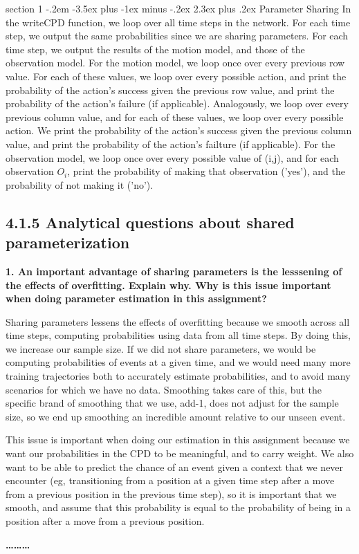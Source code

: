 \documentclass[12pt]{article}
\makeatletter
\newenvironment{problem}{\@startsection
       {section}
       {1}
       {-.2em}
       {-3.5ex plus -1ex minus -.2ex}
       {2.3ex plus .2ex}
       {\pagebreak[3]%
       \large\bf\noindent{Problem }
       }
       }
       {%
       \begin{center}\large\bf \ldots\ldots\ldots\end{center}}
\makeatother
\begin{document}
\begin{problem}{Parameter Sharing}
In the writeCPD function, we loop over all time steps in the network.
For each time step, we output the same probabilities since we are 
sharing parameters.  For each time step, we output the results of the 
motion model, and those of the observation model.
For the motion model, we loop once over every previous row value.  For 
each of these values, we loop over every possible action, and print the
probability of the action's success given the previous row value, and
print the probability of the action's failure (if applicable).  
Analogously, we loop over every previous column value, and for each of 
these values, we loop over every possible action.  We print the 
probability of the action's success given the previous column value, and
print the probability of the action's failture (if applicable).
For the observation model, we loop once over every possible value of 
(i,j), and for each observation $O_i$, print the probability of making 
that observation ('yes'), and the probability of not making it ('no').

\subsection*{4.1.5  Analytical questions about shared parameterization}

{\bf 1. An important advantage of sharing parameters is the lesssening of the
effects of overfitting.  Explain why.  Why is this issue important when
doing parameter estimation in this assignment?}

Sharing parameters lessens the effects of overfitting because we smooth
across all time steps, computing probabilities using data from all time
 steps.  By doing this, we increase our sample size.  If we did not 
share parameters, we would be computing probabilities of events at a 
given time, and we would need many more training trajectories both to 
accurately estimate probabilities, and to avoid many scenarios for which
we have no data.  Smoothing takes care of this, but the specific brand 
of smoothing that we use, add-1, does not adjust for the sample size, so
we end up smoothing an incredible amount relative to our unseen event.

This issue is important when doing our estimation in this assignment 
because we want our probabilities in the CPD to be meaningful, and to 
carry weight.  We also want to be able to predict the chance of an event
given a context that we never encounter (eg, transitioning from a 
position at a given time step after a move from a previous position in 
the previous time step), so it is important that we smooth, and assume 
that this probability is equal to the probability of being in a 
position after a move from a previous position.


\end{problem}
\end{document}
